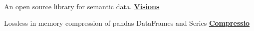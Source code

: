 \begin{cventries}
  \cventry
    {An open source library for semantic data.}
    {\href{https://github.com/dylan-profiler/visions}{\textbf{Visions}}}
    {}
    {}
    {}

  \cventry
    {Lossless in-memory compression of pandas DataFrames and Series }
    {\href{https://github.com/dylan-profiler/compressio}{\textbf{Compressio}}}
    {}
    {}
    {}
\end{cventries}

